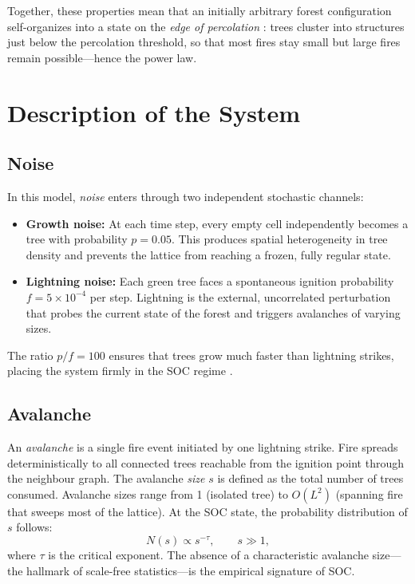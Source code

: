 \documentclass[12pt,a4paper]{article}
\begin{document}
Together, these properties mean that an initially arbitrary forest
configuration self-organizes into a state on the \emph{edge of
percolation} \cite{christensen2004}: trees cluster into structures just
below the percolation threshold, so that most fires stay small but
large fires remain possible—hence the power law.

\section{Description of the System}
\label{sec:description}

\subsection{Noise}
In this model, \emph{noise} enters through two independent stochastic
channels:
\begin{itemize}
  \item \textbf{Growth noise:} At each time step, every empty cell
        independently becomes a tree with probability $p = 0.05$.
        This produces spatial heterogeneity in tree density and prevents
        the lattice from reaching a frozen, fully regular state.
  \item \textbf{Lightning noise:} Each green tree faces a spontaneous
        ignition probability $f = 5\times10^{-4}$ per step.
        Lightning is the external, uncorrelated perturbation that
        probes the current state of the forest and triggers avalanches of
        varying sizes.
\end{itemize}
The ratio $p/f = 100$ ensures that trees grow much faster than lightning
strikes, placing the system firmly in the SOC regime \cite{drossel1992}.

\subsection{Avalanche}
An \emph{avalanche} is a single fire event initiated by one lightning
strike. Fire spreads deterministically to all connected trees reachable
from the ignition point through the neighbour graph. The avalanche
\emph{size} $s$ is defined as the total number of trees consumed.
Avalanche sizes range from 1 (isolated tree) to $O(L^2)$ (spanning fire
that sweeps most of the lattice). At the SOC state, the probability
distribution of $s$ follows:
\begin{equation}
  N(s) \propto s^{-\tau}, \qquad s \gg 1,
  \label{eq:powerlaw}
\end{equation}
where $\tau$ is the critical exponent. The absence of a characteristic
avalanche size—the hallmark of scale-free statistics—is the empirical
signature of SOC.
\end{document}
